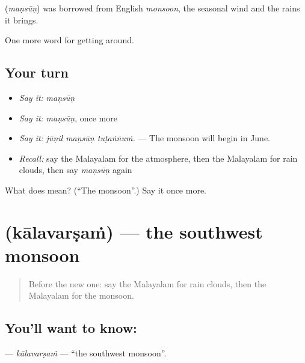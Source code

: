 \begin{cousinweb}
\textbf{} (\emph{maṇsūṇ}) was borrowed from English \emph{monsoon}, the seasonal wind and the rains it brings.
\end{cousinweb}

\begin{grammarlens}[title={What you've built}]
One more word for getting around.
\end{grammarlens}

\subsection*{Your turn}
\begin{itemize}
\raggedright
  \item \emph{Say it:} \emph{maṇsūṇ}
  \item \emph{Say it:} \emph{maṇsūṇ}, once more
  \item \emph{Say it:} \emph{jūṇil maṇsūṇ tuṭaṅṅuṁ.} — The monsoon will begin in June.
  \item \emph{Recall:} say the Malayalam for the atmosphere, then the Malayalam for rain clouds, then say \emph{maṇsūṇ} again
\end{itemize}

\begin{tcolorbox}[breakable,colback=teal!4,colframe=teal!35!black,title={Before you move on}]
What does  mean? (\textquotedblleft{}The monsoon\textquotedblright{}.) Say it once more.
\end{tcolorbox}
\section[\texorpdfstring{\ml{കാലവർഷം} (kālavarṣaṁ)}{കാലവർഷം (kālavarṣaṁ)}]{ (kālavarṣaṁ) — the southwest monsoon}

\label{lesson:ML-C507-kalavarsam}



\begin{quote}
Before the new one: say the Malayalam for rain clouds, then the Malayalam for the monsoon.
\end{quote}

\subsection*{You'll want to know: }
\textbf{} — \emph{kālavarṣaṁ} — \textquotedblleft{}the southwest monsoon\textquotedblright{}.

